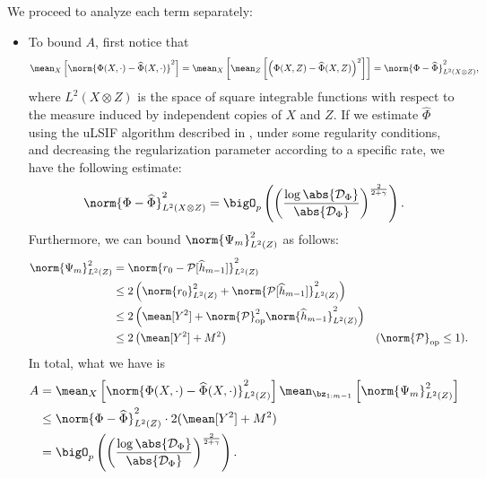 We proceed to analyze each term separately:
\begin{itemize}
    \item To bound $ A $, first notice that
        \begin{align*}
            \mean_{ X } \left[
                \norm{ \Phi ( X, \cdot ) - \hat{ \Phi } ( X, \cdot ) }^2
            \right]
            = \mean_{ X } \left[
                \mean_{ Z } \left[
                    \left(
                        \Phi ( X, Z ) - \hat{ \Phi } ( X, Z )
                    \right)^2
                \right]
            \right]
            = \norm{ \Phi - \hat{ \Phi } }_{ L^2 ( X \otimes Z ) }^2
        ,\end{align*}
        where $ L^2 ( X \otimes Z ) $ is the space of square integrable functions with respect to the measure induced by independent copies of $ X $ and $ Z $.
        If we estimate $ \hat{ \Phi } $ using the uLSIF algorithm described in \cite{sugiyama2012}, under some regularity conditions, and decreasing the regularization parameter according to a specific rate, we have the following estimate: 
        \begin{equation*}
            \norm{ \Phi - \hat{ \Phi } }^2_{ L^2 ( X \otimes Z ) }
            = \bigO_{ p } \left(
                \left(
                    \frac{ \log \abs{ \data_{ \Phi } } }{ \abs{ \data_{ \Phi } } }
                \right)^{ \frac{ 2 }{ 2 + \gamma } }
            \right)
        .\end{equation*}
    Furthermore, we can bound $ \norm{ \Psi_{ m } }_{ L^2 ( Z ) }^2 $ as follows:
    \begin{align*}
        \norm{ \Psi_{ m } }_{ L^2 ( Z ) }^2
        &= \norm{ r_{ 0 } - \meanop [ \hat{ h }_{ m-1 } ] }_{ L^2 ( Z ) }^2 \\
        &\leq 2 \left(
            \norm{ r_{ 0 } }_{ L^{ 2 } ( Z ) }^2
            + \norm{ \meanop [ \hat{ h }_{ m-1 } ] }_{ L^{ 2 } ( Z ) }^2
        \right) \\
        &\leq 2 \left(
            \mean [ Y^2 ] + \norm{ \meanop }_{ \mathrm{op} }^2 \norm{ \hat{ h }_{ m-1 } }_{ L^{ 2 } ( Z ) }^2
        \right) \\
        &\leq 2 \left(
            \mean [ Y^2 ] + M^2
        \right)
        &&( \norm{ \meanop }_{ \mathrm{op} } \leq 1 )
    .\end{align*}
    In total, what we have is
    \begin{align*}
        A &= \mean_{ X } \left[
            \norm{ \Phi ( X, \cdot ) - \hat{ \Phi } ( X, \cdot ) }_{ L^{ 2 } ( Z ) }^2
        \right]
        \mean_{ \bz_{ 1:m-1 } } \left[
            \norm{ \Psi_{ m } }_{ L^{ 2 } ( Z ) }^2
        \right] \\
        &\leq \norm{ \Phi - \hat{ \Phi } }_{ L^{ 2 } ( Z ) }^2
        \cdot 2 ( \mean [ Y^2 ] + M^2 ) \\
        &= \bigO_{ p } \left(
            \left(
                \frac{ \log \abs{ \data_{ \Phi } } }{ \abs{ \data_{ \Phi } } }
            \right)^{ \frac{ 2 }{ 2 + \gamma } }
        \right)
    .\end{align*}


\end{itemize}
